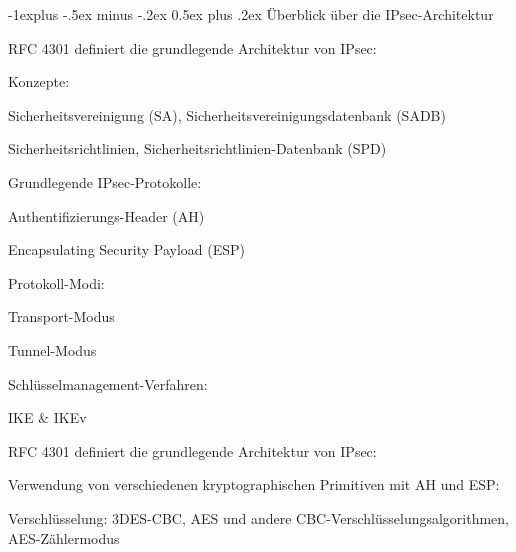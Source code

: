 \documentclass[a4paper]{article}
\makeatletter
\renewcommand{\subsection}{\@startsection{subsection}{2}{0mm}%
 {-1explus -.5ex minus -.2ex}%
 {0.5ex plus .2ex}%
 {\normalfont\normalsize\bfseries}}
\makeatother
\begin{document}
\begin{multicols}{3}
      \subsection{Überblick über die IPsec-Architektur}
      \begin{itemize*}
            \item RFC 4301 definiert die grundlegende Architektur von IPsec:
            \begin{itemize*}
                  \item Konzepte:
                  \begin{itemize*}
                        \item Sicherheitsvereinigung (SA), Sicherheitsvereinigungsdatenbank (SADB)
                        \item Sicherheitsrichtlinien, Sicherheitsrichtlinien-Datenbank (SPD)
                  \end{itemize*}
                  \item Grundlegende IPsec-Protokolle:
                  \begin{itemize*}
                        \item Authentifizierungs-Header (AH)
                        \item Encapsulating Security Payload (ESP)
                  \end{itemize*}
                  \item Protokoll-Modi:
                  \begin{itemize*}
                        \item Transport-Modus
                        \item Tunnel-Modus
                  \end{itemize*}
                  \item Schlüsselmanagement-Verfahren:
                  \begin{itemize*}
                        \item IKE \& IKEv
                  \end{itemize*}
            \end{itemize*}
            \item RFC 4301 definiert die grundlegende Architektur von IPsec:
            \begin{itemize*}
                  \item Verwendung von verschiedenen kryptographischen Primitiven mit AH und ESP:
                  \begin{itemize*}
                        \item Verschlüsselung: 3DES-CBC, AES und andere CBC-Verschlüsselungsalgorithmen, AES-Zählermodus

\end{itemize*}
\end{itemize*}
\end{itemize*}
\end{multicols}
\end{document}
